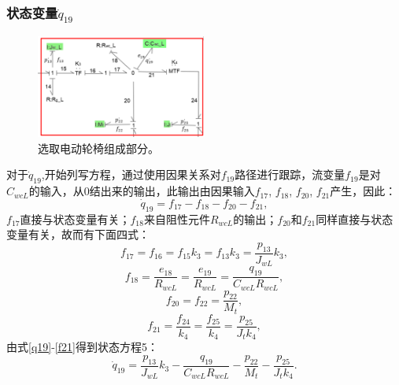 \subsubsection{状态变量$\dot{ q}_{19}$}
\begin{figure}[h]
	\centering
	\includegraphics[width=0.5\textwidth]{fig/equation5.png}
	\caption{选取电动轮椅组成部分。}\label{fig:equation5}
\end{figure}
对于$\dot{q} _ { 19 }$,开始列写方程，通过使用因果关系对$f_{19}$路径进行跟踪，流变量$f_{19}$是对$C_{wcL}$的输入，从0结出来的输出，此输出由因果输入$f _ { 17 }$, $f _ { 18 }$, $ f _ { 20 }$, $  f _ { 21 }$产生，因此：
\begin{equation}\label{q19}
\dot { q } _ { 19 } = f _ { 17 } - f _ { 18 } - f _ { 20 } - f _ { 21 },
\end{equation}
$f_{17}$直接与状态变量有关；$f_{18}$来自阻性元件$R _ { wcL }$的输出；$f_{20}$和$f_{21}$同样直接与状态变量有关，故而有下面四式：
\begin{equation}
f _ { 17 } = f _ { 16 } = f _ { 15 } k _ { 3 } = f _ { 13 } k _ { 3 } = \frac { p _ { 13 } } { J _ { w L} } k _ { 3 },
\end{equation}
\begin{equation}
f _ { 18 } = \frac { e _ { 18 } } { R _ { w c L}  } = \frac { e _ { 19 } } { R _ { w cL  } } = \frac { q _ { 19 } } { C _ { w c  L} R _ { w c L } },
\end{equation}
\begin{equation}
f _ { 20 } = f _ { 22 } = \frac { p _ { 22 } } { M _ { t } },
\end{equation}
\begin{equation}\label{f21}
f _ { 21 } = \frac { f _ { 24 } } { k _ { 4 } } = \frac { f _ { 25 } } { k _ { 4 } } = \frac { p _ { 25 } } { J _ { t } k _ { 4 } },
\end{equation}
由式\ref{q19}-\ref{f21}得到状态方程5：
\begin{equation}
\dot { q } _ { 19 } = \frac { p _ { 13 } } { J _ { w L }  } k _ { 3 } - \frac { q _ { 19 } } { C _ { w c L }  R _ { w c L }  } - \frac { p _ { 22 } } { M _ { t } } - \frac { p _ { 25 } } { J _ { t } k _ { 4 } }.
\end{equation}
